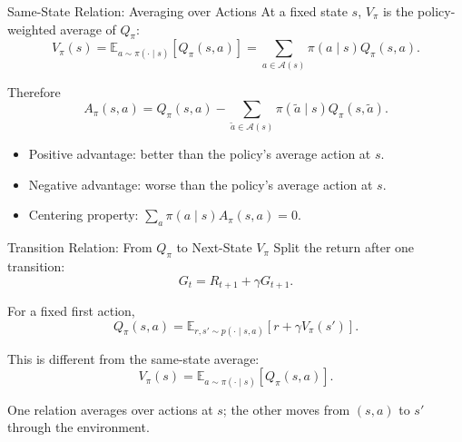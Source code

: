 \documentclass[aspectratio=169]{beamer}
\newcommand{\EE}{\mathbb{E}}
\newcommand{\Aspace}{\mathcal{A}}
\begin{document}
\begin{frame}{Same-State Relation: Averaging over Actions}
\small
At a fixed state $s$, $V_\pi$ is the policy-weighted average of $Q_\pi$:
\[
V_\pi(s)=\EE_{a\sim\pi(\cdot\mid s)}[Q_\pi(s,a)]
=\sum_{a\in\Aspace(s)}\pi(a\mid s)Q_\pi(s,a).
\]

\vspace{0.5em}
Therefore
\[
A_\pi(s,a)
=Q_\pi(s,a)
-\sum_{\tilde a\in\Aspace(s)}\pi(\tilde a\mid s)Q_\pi(s,\tilde a).
\]

\vspace{0.4em}
\begin{itemize}
    \item Positive advantage: better than the policy's average action at $s$.
    \item Negative advantage: worse than the policy's average action at $s$.
    \item Centering property: $\sum_a \pi(a\mid s)A_\pi(s,a)=0$.
\end{itemize}
\end{frame}

\begin{frame}{Transition Relation: From $Q_\pi$ to Next-State $V_\pi$}
\small
Split the return after one transition:
\[
G_t=R_{t+1}+\gamma G_{t+1}.
\]

\vspace{0.3em}
For a fixed first action,
\[
Q_\pi(s,a)=
\EE_{r,s'\sim p(\cdot\mid s,a)}[r+\gamma V_\pi(s')].
\]

\vspace{0.5em}
This is different from the same-state average:
\[
V_\pi(s)=\EE_{a\sim\pi(\cdot\mid s)}[Q_\pi(s,a)].
\]

\vspace{0.3em}
One relation averages over actions at $s$; the other moves from $(s,a)$ to $s'$ through the environment.
\end{frame}
\end{document}
